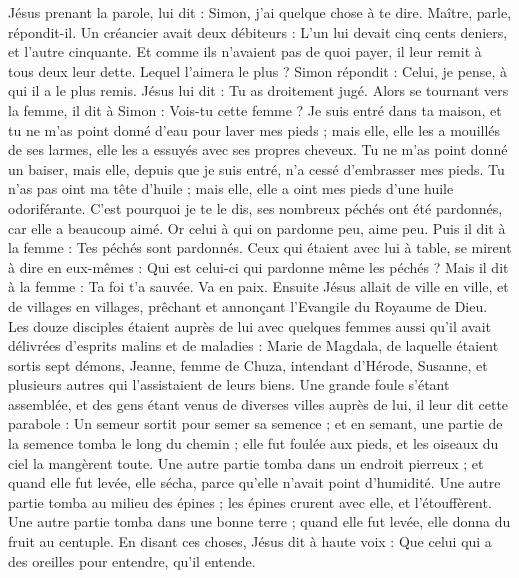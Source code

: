 \begin{multicols}{2}
Jésus prenant la parole, lui dit : Simon, j'ai quelque chose à te dire. Maître, parle, répondit-il.
Un créancier avait deux débiteurs : L’un lui devait cinq cents deniers, et l'autre cinquante.
Et comme ils n'avaient pas de quoi payer, il leur remit à tous deux leur dette. Lequel l'aimera le plus ?
Simon répondit : Celui, je pense, à qui il a le plus remis. Jésus lui dit : Tu as droitement jugé.
Alors se tournant vers la femme, il dit à Simon : Vois-tu cette femme ? Je suis entré dans ta maison, et tu ne m'as point donné d'eau pour laver mes pieds ; mais elle, elle les a mouillés de ses larmes, elle les a essuyés avec ses propres cheveux.
Tu ne m'as point donné un baiser, mais elle, depuis que je suis entré, n'a cessé d’embrasser mes pieds.
Tu n'as pas oint ma tête d'huile ; mais elle, elle a oint mes pieds d'une huile odoriférante.
C'est pourquoi je te le dis, ses nombreux péchés ont été pardonnés, car elle a beaucoup aimé. Or celui à qui on pardonne peu, aime peu.
Puis il dit à la femme : Tes péchés sont pardonnés.
Ceux qui étaient avec lui à table, se mirent à dire en eux-mêmes : Qui est celui-ci qui pardonne même les péchés ?
Mais il dit à la femme : Ta foi t'a sauvée. Va en paix.
\VerseOne{}Ensuite Jésus allait de ville en ville, et de villages en villages, prêchant et annonçant l’Evangile du Royaume de Dieu.
Les douze disciples étaient auprès de lui avec quelques femmes aussi qu'il avait délivrées d’esprits malins et de maladies : Marie de Magdala, de laquelle étaient sortis sept démons,
Jeanne, femme de Chuza, intendant d'Hérode, Susanne, et plusieurs autres qui l'assistaient de leurs biens.
Une grande foule s’étant assemblée, et des gens étant venus de diverses villes auprès de lui, il leur dit cette parabole :
Un semeur sortit pour semer sa semence ; et en semant, une partie de la semence tomba le long du chemin ; elle fut foulée aux pieds, et les oiseaux du ciel la mangèrent toute.
Une autre partie tomba dans un endroit pierreux ; et quand elle fut levée, elle sécha, parce qu'elle n'avait point d'humidité.
Une autre partie tomba au milieu des épines ; les épines crurent avec elle, et l'étouffèrent.
Une autre partie tomba dans une bonne terre ; quand elle fut levée, elle donna du fruit au centuple. En disant ces choses, Jésus dit à haute voix : Que celui qui a des oreilles pour entendre, qu'il entende.

\end{multicols}
